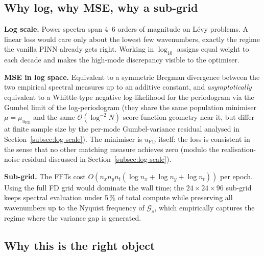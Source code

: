 \documentclass[review,12pt]{elsarticle}
\begin{document}
\subsection{Why log, why MSE, why a sub-grid}

\textbf{Log scale.} Power spectra span 4--6 orders of magnitude on
L\'evy problems. A linear loss would care only about the lowest few
wavenumbers, exactly the regime the vanilla PINN already gets
right. Working in \(\log_{10}\) assigns equal weight to each decade
and makes the high-mode discrepancy visible to the optimiser.

\textbf{MSE in log space.} Equivalent to a symmetric Bregman
divergence between the two empirical spectral measures up to an
additive constant, and \emph{asymptotically} equivalent to a
Whittle-type negative log-likelihood for the periodogram via the
Gumbel limit of the log-periodogram
\cite{Whittle1953,Dahlhaus1996,Brillinger1981} (they share the same
population minimiser \(\mu = \mu_{u_{\mathrm{FD}}}\) and the same
\(\mathcal O(\log^{-2} N)\) score-function geometry near it, but
differ at finite sample size by the per-mode Gumbel-variance residual
analysed in Section~\ref{subsec:log-scale}).
The minimiser is \(u_{\mathrm{FD}}\) itself: the loss is consistent
in the sense that no other matching measure achieves zero (modulo
the realisation-noise residual discussed in
Section~\ref{subsec:log-scale}).

\textbf{Sub-grid.} The FFTs cost
\(O(n_x n_y n_t (\log n_x + \log n_y + \log n_t))\) per epoch.
Using the full FD grid would dominate the wall time; the
\(24 \times 24 \times 96\) sub-grid keeps spectral evaluation under
5\,\% of total compute while preserving all wavenumbers up to the
Nyquist frequency of \(\mathcal{G}_s\), which empirically captures
the regime where the variance gap is generated.

\subsection{Why this is the right object}
\label{subsec:right-object}
\end{document}
